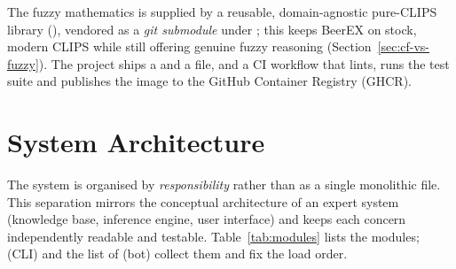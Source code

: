 The fuzzy mathematics is supplied by a reusable, domain-agnostic pure-CLIPS
library (), vendored as a \emph{git submodule} under
; this keeps BeerEX on stock, modern CLIPS while still
offering genuine fuzzy reasoning (Section~\ref{sec:cf-vs-fuzzy}). The project
ships a  and a  file, and a CI workflow
that lints, runs the test suite and publishes the image to the GitHub Container
Registry (GHCR).

\section{System Architecture}

The system is organised by \emph{responsibility} rather than as a single
monolithic file. This separation mirrors the conceptual architecture of an
expert system (knowledge base, inference engine, user interface) and keeps each
concern independently readable and testable. Table~\ref{tab:modules} lists the
modules;  (CLI) and the  list of
 (bot) collect them and fix the load order.

